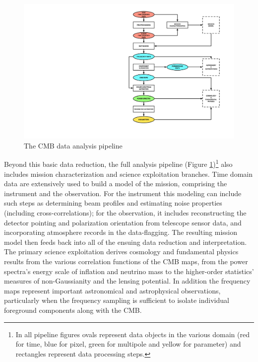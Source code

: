 \begin{figure}[htbp]
\centering
\includegraphics[width=1\textwidth]{Analysis/da}
\caption{The CMB data analysis pipeline}
\label{fig_da}
\end{figure}

Beyond this basic data reduction, the full analysis pipeline (Figure \ref{fig_da})\footnote{In all pipeline figures ovals represent data objects in the various domain (red for time, blue for pixel, green for multipole and yellow for parameter) and rectangles represent data processing steps.} also includes mission characterization and science exploitation branches. Time domain data are extensively used to build a model of the mission, comprising the instrument and the observation. For the instrument this modeling can include such steps as determining beam profiles and estimating noise properties (including cross-correlations); for the observation, it includes reconstructing the detector pointing and polarization orientation from telescope sensor data, and incorporating atmosphere records in the data-flagging. The resulting mission model then feeds back into all of the ensuing data reduction and interpretation. The primary science exploitation derives cosmology and fundamental physics results from the various correlation functions of the CMB maps, from the power spectra's energy scale of inflation and neutrino mass to the higher-order statistics'  measures of non-Gaussianity and the lensing potential. In addition the frequency maps represent important astronomical and astrophysical observations, particularly when the frequency sampling is sufficient to isolate individual foreground components along with the CMB. 

\newpage

